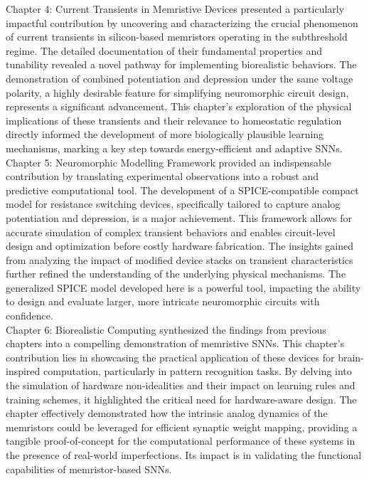 \noindent Chapter 4: Current Transients in Memristive Devices presented a particularly impactful contribution by uncovering and characterizing the crucial phenomenon of current transients in silicon-based memristors operating in the subthreshold regime. The detailed documentation of their fundamental properties and tunability revealed a novel pathway for implementing biorealistic behaviors. The demonstration of combined potentiation and depression under the same voltage polarity, a highly desirable feature for simplifying neuromorphic circuit design, represents a significant advancement. This chapter's exploration of the physical implications of these transients and their relevance to homeostatic regulation directly informed the development of more biologically plausible learning mechanisms, marking a key step towards energy-efficient and adaptive SNNs.\\

\noindent Chapter 5: Neuromorphic Modelling Framework provided an indispensable contribution by translating experimental observations into a robust and predictive computational tool. The development of a SPICE-compatible compact model for resistance switching devices, specifically tailored to capture analog potentiation and depression, is a major achievement. This framework allows for accurate simulation of complex transient behaviors and enables circuit-level design and optimization before costly hardware fabrication. The insights gained from analyzing the impact of modified device stacks on transient characteristics further refined the understanding of the underlying physical mechanisms. The generalized SPICE model developed here is a powerful tool, impacting the ability to design and evaluate larger, more intricate neuromorphic circuits with confidence.\\

\noindent Chapter 6: Biorealistic Computing synthesized the findings from previous chapters into a compelling demonstration of memristive SNNs. This chapter's contribution lies in showcasing the practical application of these devices for brain-inspired computation, particularly in pattern recognition tasks. By delving into the simulation of hardware non-idealities and their impact on learning rules and training schemes, it highlighted the critical need for hardware-aware design. The chapter effectively demonstrated how the intrinsic analog dynamics of the memristors could be leveraged for efficient synaptic weight mapping, providing a tangible proof-of-concept for the computational performance of these systems in the presence of real-world imperfections. Its impact is in validating the functional capabilities of memristor-based SNNs.\\


